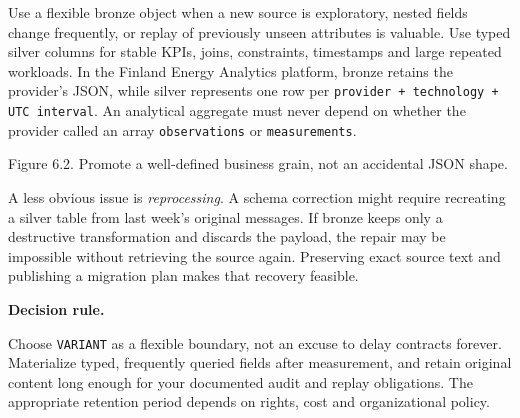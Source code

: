 \documentclass[11pt,twoside]{article}
\begin{document}
Use a flexible bronze object when a new source is exploratory, nested fields change frequently, or replay of previously unseen attributes is valuable. Use typed silver columns for stable KPIs, joins, constraints, timestamps and large repeated workloads. In the Finland Energy Analytics platform, bronze retains the provider's JSON, while silver represents one row per \texttt{provider + technology + UTC interval}. An analytical aggregate must never depend on whether the provider called an array \texttt{observations} or \texttt{measurements}.

\begin{center}\par{\fontsize{8}{10}\selectfont\color{inkgray}Figure 6.2. Promote a well-defined business grain, not an accidental JSON shape.}\end{center}

A less obvious issue is \emph{reprocessing}. A schema correction might require recreating a silver table from last week's original messages. If bronze keeps only a destructive transformation and discards the payload, the repair may be impossible without retrieving the source again. Preserving exact source text and publishing a migration plan makes that recovery feasible.

\begin{insight}\textbf{Decision rule.}\par
Choose \texttt{VARIANT} as a flexible boundary, not an excuse to delay contracts forever. Materialize typed, frequently queried fields after measurement, and retain original content long enough for your documented audit and replay obligations. The appropriate retention period depends on rights, cost and organizational policy.\end{insight}
\end{document}
